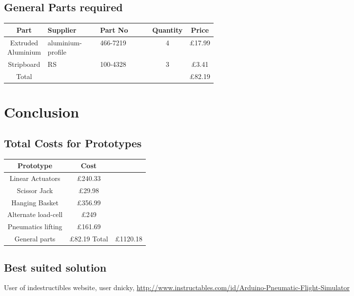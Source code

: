 \documentclass[11pt]{article}
\begin{document}
\subsection{General Parts required} 
\begin{center}
    \begin{longtable}{||c | p{0.25\linewidth}   |p{0.25\linewidth} | c | c||} 
      \hline
      Part & Supplier & Part No & Quantity & Price \\ [0.5ex] 
      \hline\hline
      Extruded Aluminium & aluminium-profile &  466-7219 & 4 & \pounds17.99\\
      \hline
      Stripboard & RS & 100-4328 & 3 & \pounds3.41\\
      \hline
      \hline
      Total & & & & \pounds82.19\\
      \hline
    \end{longtable}
\end{center}



\section{Conclusion}

\subsection{Total Costs for Prototypes}

\begin{center}

  \begin{longtable}{||c|c||}
    \hline
    Prototype & Cost \\ [0.5ex]
    \hline \hline
    Linear Actuators & \pounds240.33\\
    \hline
    Scissor Jack & \pounds29.98\\
    \hline
    Hanging Basket & \pounds356.99 \\
    \hline
    Alternate load-cell &\pounds249 \\
    \hline
    Pneumatics lifting & \pounds161.69 \\ 
    \hline
    General parts & \pounds 82.19
    \hline
    Total & \pounds1120.18 \\
    \hline
  \end{longtable}

\end{center} 

\subsection{Best suited solution}


\begin{thebibliography}{9}
  
  User of indestructibles website, user dnicky,
  \url{http://www.instructables.com/id/Arduino-Pneumatic-Flight-Simulator}
\end{thebibliography}
\end{document}
